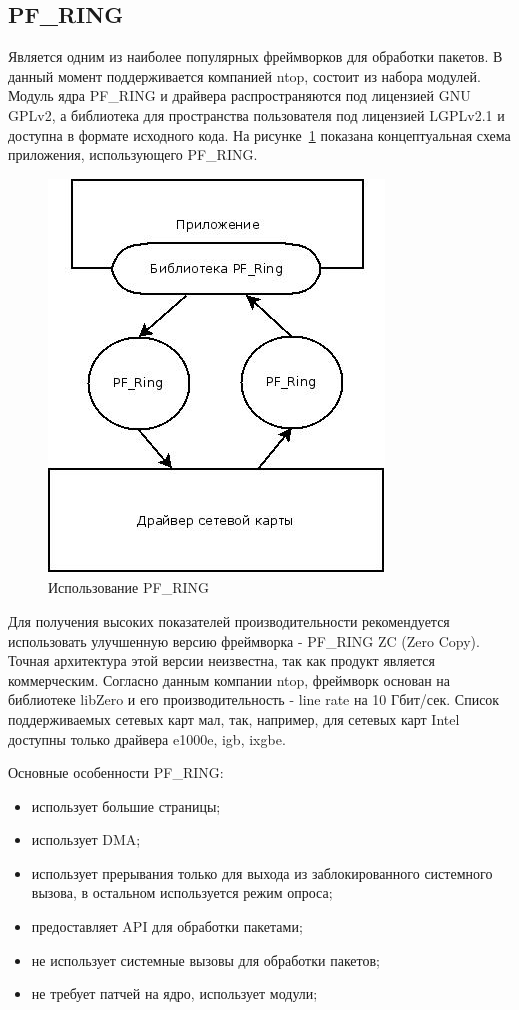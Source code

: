 \subsection{{PF\_RING}}
Является одним из наиболее популярных фреймворков для обработки пакетов. В данный момент поддерживается компанией ntop, состоит из набора модулей. Модуль ядра PF\_RING и драйвера распространяются под лицензией GNU GPLv2, а библиотека для пространства пользователя под лицензией LGPLv2.1 и доступна в формате исходного кода. На рисунке~\ref{pic:pfring_example} показана концептуальная схема приложения, использующего PF\_RING.
\begin{figure}[h]
\centering
\includegraphics[scale=0.7]{pictures/pfring_example}
\caption{Использование PF\_RING}
\label{pic:pfring_example}
\end{figure}

Для получения высоких показателей производительности рекомендуется использовать улучшенную версию фреймворка - PF\_RING ZC (Zero Copy). Точная архитектура этой версии неизвестна, так как продукт является коммерческим. Согласно данным компании ntop, фреймворк основан на библиотеке libZero и его производительность - line rate на 10 Гбит/сек. Список поддерживаемых сетевых карт мал, так, например, для сетевых карт Intel доступны только драйвера e1000e, igb, ixgbe.

Основные особенности PF\_RING:
\begin{itemize}
\item использует большие страницы;
\item использует DMA;
\item использует прерывания только для выхода из заблокированного системного вызова, в остальном используется режим опроса;
\item предоставляет API для обработки пакетами;
\item не использует системные вызовы для обработки пакетов;
\item не требует патчей на ядро, использует модули;
\end{itemize}

